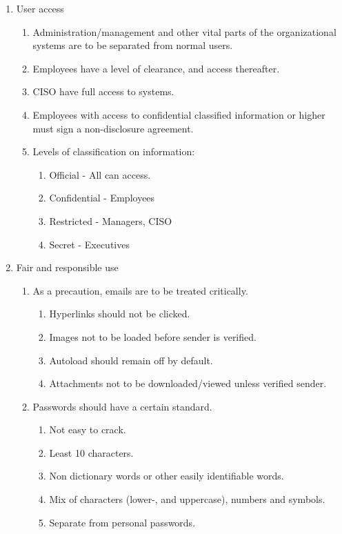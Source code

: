\begin{enumerate}
  \item User access
  \begin{enumerate}
    \item Administration/management and other vital parts of the organizational systems are to be separated from normal users.
    \item Employees have a level of clearance, and access thereafter. 
    \item CISO have full access to systems.
    \item Employees with access to confidential classified information or higher must sign a non-disclosure agreement.
    \item Levels of classification on information:
    \begin{enumerate}
      \item Official - All can access.
      \item Confidential - Employees
      \item Restricted - Managers, CISO
      \item Secret - Executives
    \end{enumerate}
  \end{enumerate}
  \item Fair and responsible use
  \begin{enumerate}
    \item As a precaution, emails are to be treated critically.
    \begin{enumerate}
      \item Hyperlinks should not be clicked.
      \item Images not to be loaded before sender is verified.
      \item Autoload should remain off by default.
      \item Attachments not to be downloaded/viewed unless verified sender.
    \end{enumerate}
    \item Passwords should have a certain standard.
    \begin{enumerate}
      \item Not easy to crack.
      \item Least 10 characters.
      \item Non dictionary words or other easily identifiable words.
      \item Mix of characters (lower-, and uppercase), numbers and symbols.
      \item Separate from personal passwords.

\end{enumerate}
\end{enumerate}
\end{enumerate}

